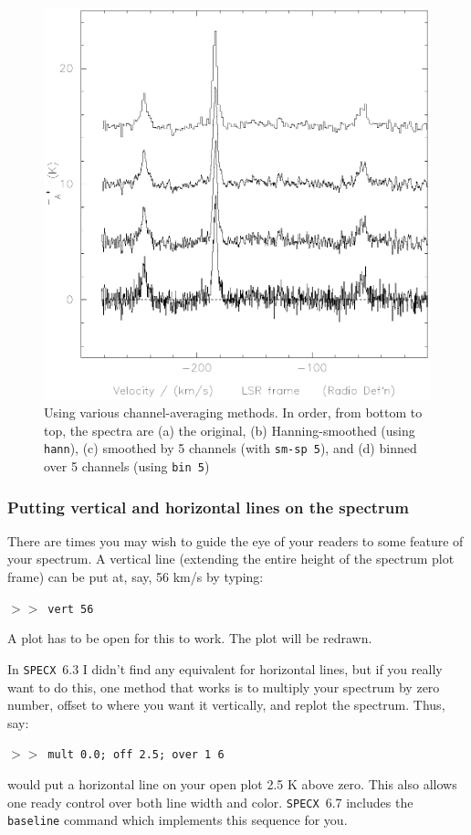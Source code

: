 \documentclass[11pt,twoside]{starlink}
\providecommand{\SPECX}{\texttt{SPECX}}
\providecommand{\SP}{{$>\!>$}}
\begin{document}
\begin{figure}[htb]
\centering
\includegraphics[height=0.8\textwidth]{sc8_smooth}
\caption[Binning and smoothing spectra]
{\small{Using various channel-averaging methods. In order, from bottom
to top, the spectra are (a) the original, (b) Hanning-smoothed (using
\texttt{hann}), (c) smoothed by 5 channels (with \texttt{sm-sp 5}), and (d)
binned over 5 channels (using \texttt{bin 5})} }
\label{fig:specx_smooth}
\end{figure}

\subsubsection{Putting vertical and horizontal lines on the spectrum}
\label{sec:specx_lines}
There are times you may wish to guide the eye of your readers to some
feature of your spectrum. A vertical line (extending the entire height
of the spectrum plot frame) can be put at, say, 56 km/s by typing:

\SP\ \verb|vert 56|

A plot has to be open for this to work. The plot will be redrawn.

In \SPECX\ 6.3 I didn't find any equivalent for horizontal
lines, but if you really want to do
this, one method that works is to multiply your spectrum by zero
number, offset to where you want it vertically, and replot the
spectrum. Thus, say:

\SP\ \verb|mult 0.0; off 2.5; over 1 6|

would put a horizontal line on your open plot 2.5 K above zero. This
also allows one ready control over both line width and color. \SPECX\
6.7 includes the \texttt{baseline} command which implements this sequence
for you.
\end{document}
